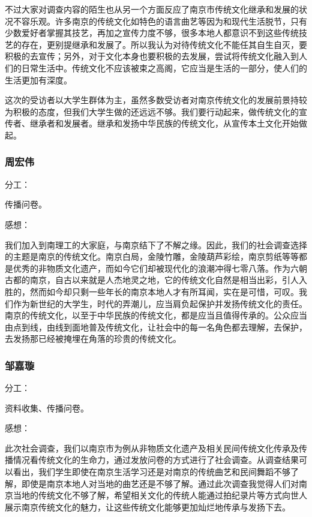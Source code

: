 \documentclass[12pt]{article}%
\begin{document}
不过大家对调查内容的陌生也从另一个方面反应了南京市传统文化继承和发展的状况不容乐观。许多南京的传统文化如特色的语言曲艺等因为和现代生活脱节，只有少数爱好者掌握其技艺，再加之宣传力度不够，很多本地人都意识不到这些传统技艺的存在，更别提继承和发展了。所以我认为对待传统文化不能任其自生自灭，要积极的去宣传；另外，对于文化本身也要积极的去发展，尝试将传统文化融入到人们的日常生活中。传统文化不应该被束之高阁，它应当是生活的一部分，使人们的生活更加有深度。

这次的受访者以大学生群体为主，虽然多数受访者对南京传统文化的发展前景持较为积极的态度，但我们大学生做的还远远不够。我们要行动起来，做传统文化的宣传者、继承者和发展者。继承和发扬中华民族的传统文化，从宣传本土文化开始做起。



\subsubsection{周宏伟}
分工：

传播问卷。

感想：

我们加入到南理工的大家庭，与南京结下了不解之缘。因此，我们的社会调查选择的主题是南京的传统文化。南京白局，金陵竹雕，金陵葫芦彩绘，南京剪纸等等都是优秀的非物质文化遗产，而如今它们却被现代化的浪潮冲得七零八落。作为六朝古都的南京，自古以来就是人杰地灵之地，它的传统文化自然是相当出彩，引人入胜的，然而如今却只剩一些年长的南京本地人才有所耳闻，实在是可惜，可叹。我们作为新世纪的大学生，时代的弄潮儿，应当肩负起保护并发扬传统文化的责任。南京的传统文化，以至于中华民族的传统文化，都是应当且值得传承的。公众应当由点到线，由线到面地普及传统文化，让社会中的每一名角色都去理解，去保护，去发扬那已经被掩埋在角落的珍贵的传统文化。

\subsubsection{邹嘉璇}

分工：

资料收集、传播问卷。

感想：

‌此次社会调查，我们以南京市为例从非物质文化遗产及相关民间传统文化传承及传播情况看传统文化的生命力，通过发放问卷的方式进行了社会调查。从调查结果可以看出，我们学生即使在南京生活学习还是对南京的传统曲艺和民间舞蹈不够了解，即使是南京本地人对当地的曲艺还是不够了解。通过此次调查我觉得人们对南京当地的传统文化不够了解，希望相关文化的传统人能通过拍纪录片等方式向世人展示南京传统文化的魅力，让这些传统文化能够更加灿烂地传承与发扬下去。
\end{document}
